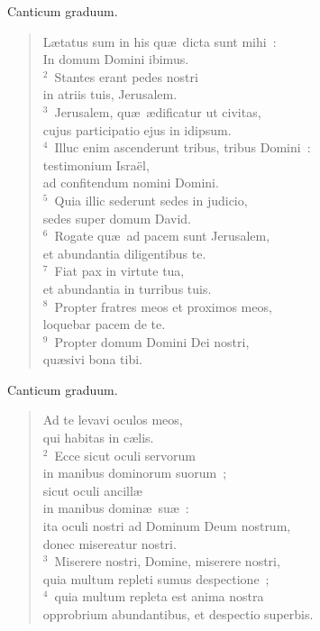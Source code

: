 \lettrine[lines=3,image=true,loversize=0.05,lraise=-0.03]{C}{}anticum graduum. \begin{flushleft}\begin{verse}\vspace{6pt}L\ae tatus sum in his qu\ae\ dicta sunt mihi~:\\ In domum Domini ibimus.\\
${}^{2}$~Stantes erant pedes nostri\\ in atriis tuis, Jerusalem.\\
${}^{3}$~Jerusalem, qu\ae\ \ae dificatur ut civitas,\\ cujus participatio ejus in idipsum.\\
${}^{4}$~Illuc enim ascenderunt tribus, tribus Domini~:\\ testimonium Isra\"el,\\ ad confitendum nomini Domini.\\
${}^{5}$~Quia illic sederunt sedes in judicio,\\ sedes super domum David.\\
${}^{6}$~Rogate qu\ae\ ad pacem sunt Jerusalem,\\ et abundantia diligentibus te.\\
${}^{7}$~Fiat pax in virtute tua,\\ et abundantia in turribus tuis.\\
${}^{8}$~Propter fratres meos et proximos meos,\\ loquebar pacem de te.\\
${}^{9}$~Propter domum Domini Dei nostri,\\ qu\ae sivi bona tibi.\end{verse}\end{flushleft}



\lettrine[lines=3,image=true,loversize=0.05,lraise=-0.03]{C}{}anticum graduum. \begin{flushleft}\begin{verse}\vspace{6pt}Ad te levavi oculos meos,\\ qui habitas in c\ae lis.\\
${}^{2}$~Ecce sicut oculi servorum\\ in manibus dominorum suorum~;\\ sicut oculi ancill\ae \\ in manibus domin\ae\ su\ae~:\\ ita oculi nostri ad Dominum Deum nostrum,\\ donec misereatur nostri.\\
${}^{3}$~Miserere nostri, Domine, miserere nostri,\\ quia multum repleti sumus despectione~;\\
${}^{4}$~quia multum repleta est anima nostra\\ opprobrium abundantibus, et despectio superbis.\end{verse}\end{flushleft}




